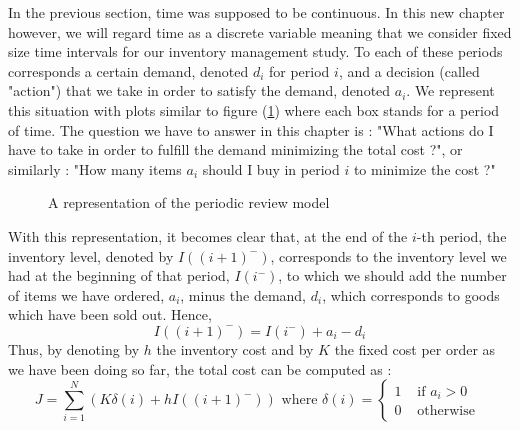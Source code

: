 In the previous section, time was supposed to be continuous. In this new chapter however, we will regard time as a discrete variable meaning that we consider fixed size time intervals for our inventory management study. To each of these periods corresponds a certain demand, denoted $d_i$ for period $i$, and a decision (called "action") that we take in order to satisfy the demand, denoted $a_i$. We represent this situation with plots similar to figure (\ref{periodic:plot}) where each box stands for a period of time. The question we have to answer in this chapter is : "What actions do I have to take in order to fulfill the demand minimizing the total cost ?", or similarly : "How many items $a_i$ should I buy in period $i$ to minimize the cost ?"

\begin{figure}[h!]
    \centering
    \caption{\label{periodic:plot}A representation of the periodic review model}
\end{figure}

With this representation, it becomes clear that, at the end of the $i$-th period, the inventory level, denoted by $I((i+1)^-)$, corresponds to the inventory level we had at the beginning of that period, $I(i^-)$, to which we should add the number of items we have ordered, $a_i$, minus the demand, $d_i$, which corresponds to goods which have been sold out. Hence, \[ I((i+1)^-) = I(i^-) + a_i - d_i \] Thus, by denoting by $h$ the inventory cost and by $K$ the fixed cost per order as we have been doing so far, the total cost can be computed as :
\[
    J = \sum_{i=1}^N\left( K\delta(i) + hI((i+1)^-) \right)
    \textrm{ where }
    \delta(i) = \begin{cases}
        1 &\textrm{ if } a_i > 0\\
        0 &\textrm{ otherwise }
    \end{cases}
\]

